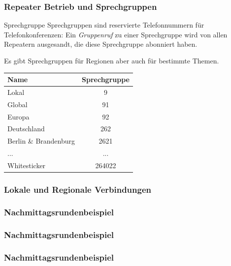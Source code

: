 \documentclass[aspectratio=169]{beamer}
\begin{document}
\begin{frame} \frametitle{Repeater Betrieb und Sprechgruppen}
 \begin{block}{Sprechgruppe}
  Sprechgruppen sind reservierte Telefonnummern für Telefonkonferenzen: Ein \emph{Gruppenruf} zu einer Sprechgruppe wird von allen Repeatern ausgesandt, die diese Sprechgruppe abonniert haben.
  
  Es gibt Sprechgruppen für Regionen aber auch für bestimmte Themen.
 \end{block}
 \begin{center}
  \begin{tabular}{|l|c|} \hline
  Name & Sprechgruppe \\ \hline
  Lokal & 9 \\
  Global & 91 \\
  Europa & 92 \\
  Deutschland & 262 \\
  Berlin \& Brandenburg & 2621 \\
  ... & ... \\
  Whitesticker & 264022\\ \hline
 \end{tabular}
 \end{center}
\end{frame}

\begin{frame}\frametitle{Lokale und Regionale Verbindungen}
 \begin{center}
  
 \end{center} 
\end{frame}

\begin{frame}\frametitle{Nachmittagsrundenbeispiel}
 \begin{center}
  
 \end{center}
\end{frame}

\begin{frame}\frametitle{Nachmittagsrundenbeispiel}
 \begin{center}
  
 \end{center}
\end{frame}

\begin{frame}\frametitle{Nachmittagsrundenbeispiel}
 \begin{center}
  
 \end{center}
\end{frame}
\end{document}
